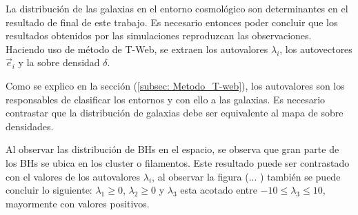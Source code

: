 La distribución de las galaxias en el entorno cosmológico son determinantes en el resultado de final de este trabajo. Es necesario entonces poder concluir que los resultados obtenidos por las simulaciones reproduzcan las observaciones. Haciendo uso de método de T-Web, se extraen los autovalores $\lambda_{i}$, los autovectores $\vec{e}_{i}$ y la sobre densidad $\delta$. 

Como se explico en la sección (\ref{subsec: Metodo_T-web}),  los autovalores son los responsables de clasificar los entornos y con ello a las galaxias. Es necesario contrastar que la distribución de galaxias debe ser equivalente al mapa de sobre densidades. 

Al observar las distribución de BHs en el espacio, se observa que gran parte de los BHs se ubica en los cluster o filamentos. Este resultado puede ser contrastado con el valores de los autovalores $\lambda_{i}$, al observar la figura (... ) también se puede concluir lo siguiente:  $\lambda_{1}\geq 0$,  $\lambda_{2}\geq 0$ y $\lambda_{3}$ esta acotado entre $-10 \leq \lambda_{3}\leq 10$, mayormente con valores positivos.



